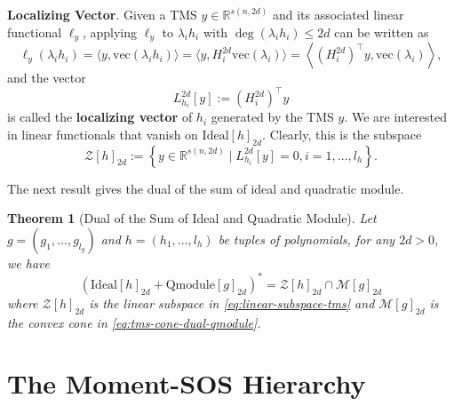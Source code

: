 \documentclass[
]{book}
\newtheorem{theorem}{Theorem}[chapter]
\theoremstyle{definition}
\theoremstyle{definition}
\theoremstyle{definition}
\theoremstyle{definition}
\theoremstyle{remark}
\begin{document}
\textbf{Localizing Vector}. Given a TMS \(y \in \mathbb{R}^{s(n,2d)}\) and its associated linear functional \(\ell_y\), applying \(\ell_y\) to \(\lambda_i h_i\) with \(\deg(\lambda_i h_i) \leq 2d\) can be written as
\[
\ell_y(\lambda_i h_i) = \langle y, \mathrm{vec}(\lambda_i h_i) \rangle = \langle y, H_i^{2d} \mathrm{vec}(\lambda_i) \rangle = \left\langle (H_i^{2d})^\top y, \mathrm{vec}(\lambda_i) \right\rangle,
\]
and the vector
\begin{equation}
L_{h_i}^{2d}[y] := (H_i^{2d})^\top y
\label{eq:localizing-vector}
\end{equation}
is called the \textbf{localizing vector} of \(h_i\) generated by the TMS \(y\). We are interested in linear functionals that vanish on \(\mathrm{Ideal}[h]_{2d}\). Clearly, this is the subspace
\begin{equation}
\mathcal{Z}[h]_{2d} :=  \left\{ y \in \mathbb{R}^{s(n,2d)} \mid L_{h_i}^{2d}[y] = 0,i=1,\dots,l_h  \right\} .
\label{eq:linear-subspace-tms}
\end{equation}

The next result gives the dual of the sum of ideal and quadratic module.

\begin{theorem}[Dual of the Sum of Ideal and Quadratic Module]
\protect\hypertarget{thm:DualSumIdealQuadraticModule}{}\label{thm:DualSumIdealQuadraticModule}Let \(g=(g_1,\dots,g_{l_g})\) and \(h=(h_1,\dots,l_h)\) be tuples of polynomials, for any \(2d > 0\), we have
\[
\left( \mathrm{Ideal}[h]_{2d} + \mathrm{Qmodule}[g]_{2d} \right)^* = \mathcal{Z}[h]_{2d} \cap \mathcal{M}[g]_{2d}
\]
where \(\mathcal{Z}[h]_{2d}\) is the linear subspace in \eqref{eq:linear-subspace-tms} and \(\mathcal{M}[g]_{2d}\) is the convex cone in \eqref{eq:tms-cone-dual-qmodule}.
\end{theorem}

\section{The Moment-SOS Hierarchy}\label{the-moment-sos-hierarchy}
\end{document}
